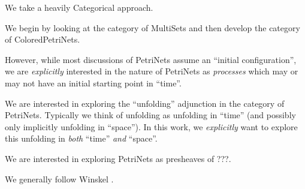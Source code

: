 

We take a heavily Categorical approach.

We begin by looking at the category of MultiSets and then develop the category
of ColoredPetriNets.

However, while most discussions of PetriNets assume an ``initial
configuration'', we are \emph{explicitly} interested in the nature of PetriNets
as \emph{processes} which may or may not have an initial starting point in
``time''.

We are interested in exploring the ``unfolding'' adjunction in the category of
PetriNets. Typically we think of unfolding as unfolding in ``time'' (and
possibly only implicitly unfolding in ``space''). In this work, we
\emph{explicitly} want to explore this unfolding in \emph{both} ``time''
\emph{and} ``space''.

We are interested in exploring PetriNets as presheaves of ???.

We generally follow Winskel \cite{keylist}.
